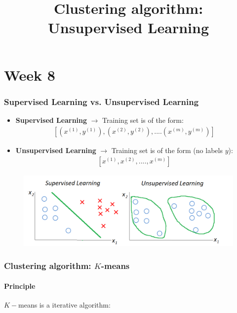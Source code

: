 \documentclass[a4paper,12pt]{report}
\begin{document}
\tableofcontents

\title{Clustering algorithm: Unsupervised Learning}
\maketitle
\part{Week 8}
\section{Supervised Learning vs. Unsupervised Learning}
\begin{itemize}
	\item \textbf{Supervised Learning} $\rightarrow$ Training set is of the form:\\
	\begin{align*}
		\left[(x^{(1)}, y^{(1)}), (x^{(2)}, y^{(2)}), ....(x^{(m)}, y^{(m)}) \right]
	\end{align*}
	\item \textbf{Unsupervised Learning} $\rightarrow$ Training set is of the form (no labels $y$):\\
	\begin{align*}
		\left[ x^{(1)}, x^{(2)},....,x^{(m)} \right]
	\end{align*} 
\end{itemize}

\begin{figure}[H]
	\centering
        \includegraphics[totalheight=4 cm]{fig1.png}
\end{figure}


\section{Clustering algorithm: $K$-means}
	\subsection{Principle}
$K-$means is a iterative algorithm:
\end{document}
